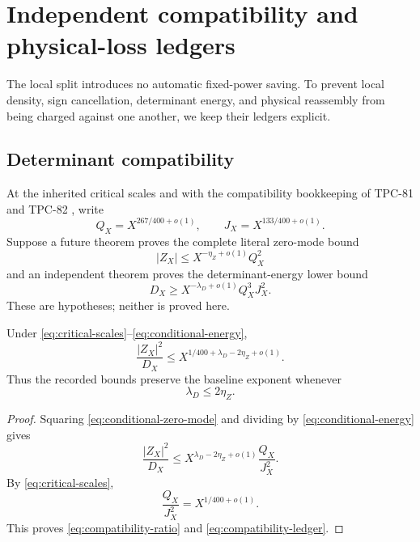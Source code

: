 \section{Independent compatibility and physical-loss ledgers}
\label{sec:separate-ledgers}

The local split introduces no automatic fixed-power saving.  To
prevent local density, sign cancellation, determinant energy, and
physical reassembly from being charged against one another, we keep
their ledgers explicit.

\subsection{Determinant compatibility}

At the inherited critical scales and with the compatibility
bookkeeping of TPC-81 and TPC-82
\citep{WangTPC81,WangTPC82}, write
\begin{equation}
 Q_X=X^{267/400+o(1)},\qquad
 J_X=X^{133/400+o(1)}.
\label{eq:critical-scales}
\end{equation}
Suppose a future theorem proves the complete literal zero-mode bound
\begin{equation}
 |Z_X|
 \le
 X^{-\eta_Z+o(1)}Q_X^2
\label{eq:conditional-zero-mode}
\end{equation}
and an independent theorem proves the determinant-energy lower bound
\begin{equation}
 D_X
 \ge
 X^{-\lambda_D+o(1)}Q_X^3J_X^2.
\label{eq:conditional-energy}
\end{equation}
These are hypotheses; neither is proved here.

\begin{proposition}
\label{prop:compatibility-exponent}
Under \eqref{eq:critical-scales}--\eqref{eq:conditional-energy},
\begin{equation}
 \frac{|Z_X|^2}{D_X}
 \le
 X^{1/400+\lambda_D-2\eta_Z+o(1)}.
\label{eq:compatibility-ratio}
\end{equation}
Thus the recorded bounds preserve the baseline exponent whenever
\begin{equation}
 \boxed{\lambda_D\le2\eta_Z.}
\label{eq:compatibility-ledger}
\end{equation}
\end{proposition}

\begin{proof}
Squaring \eqref{eq:conditional-zero-mode} and dividing by
\eqref{eq:conditional-energy} gives
\[
 \frac{|Z_X|^2}{D_X}
 \le
 X^{\lambda_D-2\eta_Z+o(1)}
 \frac{Q_X}{J_X^2}.
\]
By \eqref{eq:critical-scales},
\[
 \frac{Q_X}{J_X^2}=X^{1/400+o(1)}.
\]
This proves \eqref{eq:compatibility-ratio} and
\eqref{eq:compatibility-ledger}.
\end{proof}

